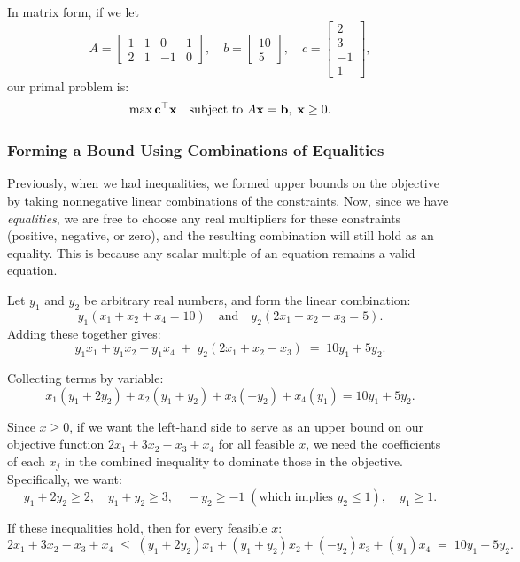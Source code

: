 In matrix form, if we let 
\[
A = \begin{bmatrix}
1 & 1 & 0 & 1 \\
2 & 1 & -1 & 0
\end{bmatrix}, \quad b = \begin{bmatrix}10 \\ 5\end{bmatrix}, \quad c = \begin{bmatrix}2 \\ 3 \\ -1 \\ 1\end{bmatrix},
\]
our primal problem is:
\[
\max \mathbf{c}^\top \mathbf{x} \quad\mbox{subject to } A \mathbf{x} = \mathbf{b}, \; \mathbf{x} \geq 0.
\]

\subsubsection*{Forming a Bound Using Combinations of Equalities}

Previously, when we had inequalities, we formed upper bounds on the objective by taking nonnegative linear combinations of the constraints. Now, since we have \emph{equalities}, we are free to choose any real multipliers for these constraints (positive, negative, or zero), and the resulting combination will still hold as an equality. This is because any scalar multiple of an equation remains a valid equation.

Let $y_1$ and $y_2$ be arbitrary real numbers, and form the linear combination:
\[
y_1 (x_1 + x_2 + x_4 = 10) \quad \text{and} \quad y_2 (2x_1 + x_2 - x_3 = 5).
\]
Adding these together gives:
\[
y_1 x_1 + y_1 x_2 + y_1 x_4 \;+\; y_2(2x_1 + x_2 - x_3) \;=\; 10y_1 + 5y_2.
\]

Collecting terms by variable:
\[
x_1(y_1 + 2y_2) + x_2(y_1 + y_2) + x_3(-y_2) + x_4(y_1) = 10y_1 + 5y_2.
\]

Since $x \geq 0$, if we want the left-hand side to serve as an upper bound on our objective function $2x_1 + 3x_2 - x_3 + x_4$ for all feasible $x$, we need the coefficients of each $x_j$ in the combined inequality to dominate those in the objective. Specifically, we want:
\[
y_1 + 2y_2 \geq 2, \quad y_1 + y_2 \geq 3, \quad -y_2 \geq -1 \;(\text{which implies } y_2 \leq 1), \quad y_1 \geq 1.
\]

If these inequalities hold, then for every feasible $x$:
\[
2x_1 + 3x_2 - x_3 + x_4 \;\leq\; (y_1+2y_2)x_1 + (y_1+y_2)x_2 + (-y_2)x_3 + (y_1)x_4 \;=\; 10y_1 + 5y_2.
\]

